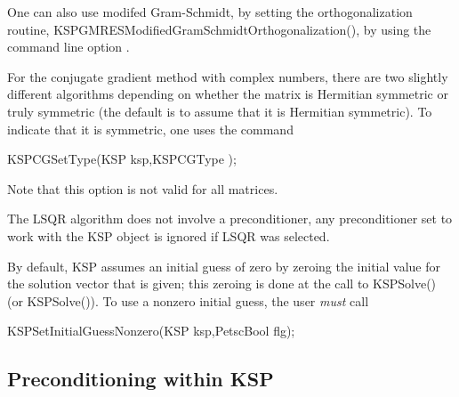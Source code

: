 One can also use 
modifed Gram-Schmidt, 
by setting the orthogonalization routine,
KSPGMRESModifiedGramSchmidtOrthogonalization(), by using the command line option 
. 

For the conjugate gradient method with complex numbers, there are two
slightly different algorithms depending on whether the matrix is 
Hermitian symmetric or truly symmetric (the default is to assume that
it is Hermitian symmetric). To indicate that it is symmetric, one uses the command
\begin{tabbing}
  KSPCGSetType(KSP ksp,KSPCGType );
\end{tabbing}
Note that this option is not valid for all matrices.

The LSQR algorithm does not involve a preconditioner, any preconditioner
set to work with the KSP object is ignored if LSQR was selected.

By default, KSP assumes an initial guess of zero by zeroing the initial 
value for the solution vector that is given; this zeroing is done at the
call to KSPSolve() (or KSPSolve()). To use a nonzero 
initial guess, the user {\em must} call
\begin{tabbing}
  KSPSetInitialGuessNonzero(KSP ksp,PetscBool  flg);
\end{tabbing}

\subsection{Preconditioning within KSP} 
\label{sec_ksppc}

